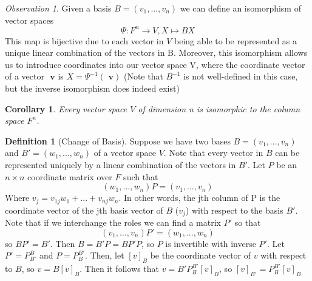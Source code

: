 \documentclass[12pt]{article}
\newtheorem{cor}[thm]{Corollary}
\theoremstyle{definition}
\newtheorem{defn}[thm]{Definition}
\theoremstyle{remark}
\newtheorem{obs}[thm]{Observation}
\numberwithin{equation}{section}
\newcommand\B[1]{\textbf{ #1}}
\begin{document}
\vspace{15pt}

\begin{obs}
        Given a basis $B = (v_1,...,v_n)$ we can define an isomorphism of vector spaces \begin{equation}
                \Psi: F^n \rightarrow V, X\mapsto BX
        \end{equation}
        This map is bijective due to each vector in $V$ being able to be represented as a unique linear combination of the vectors in B. Moreover, this isomorphism allows us to introduce coordinates into our vector space V, where the coordinate vector of a vector $\B{v}$ is $X = \Psi^{-1}(\B{v})$ (Note that $B^{-1}$ is not well-defined in this case, but the inverse isomorphism does indeed exist)
\end{obs}

\vspace{15pt}

\begin{cor}
        Every vector space $V$ of dimension n is isomorphic to the column space $F^n$.
\end{cor}

\vspace{15pt}

\begin{defn}[Change of Basis]
        Suppose we have two bases $B = (v_1,...,v_n)$ and $B' = (w_1,...,w_n)$ of a vector space $V$. Note that every vector in $B$ can be represented uniquely by a linear combination of the vectors in $B'$. Let $P$ be an $n\times n$ coordinate matrix over $F$ such that \begin{equation}
                (w_1,...,w_n)P = (v_1,...,v_n)
        \end{equation}
        Where $v_j = v_{1j}w_1+...+v_{nj}w_n$. In other words, the jth column of P is the coordinate vector of the jth basis vector of $B$ ($v_j$) with respect to the basis $B'$. Note that if we interchange the roles we can find a matrix $P'$ so that \begin{equation}
                (v_1,...,v_n)P' = (w_1,...,w_n)
        \end{equation}
        so $BP' = B'$. Then $B = B'P = BP'P$, so $P$ is invertible with inverse $P'$. Let $P' = P_{B'}^B$ and $P = P_B^{B'}$. Then, let $[v]_B$ be the coordinate vector of $v$ with respect to $B$, so $v = B[v]_B$. Then it follows that $v = B'P_B^{B'}[v]_B$, so $[v]_{B'} = P_B^{B'}[v]_B$
\end{defn}
\end{document}
